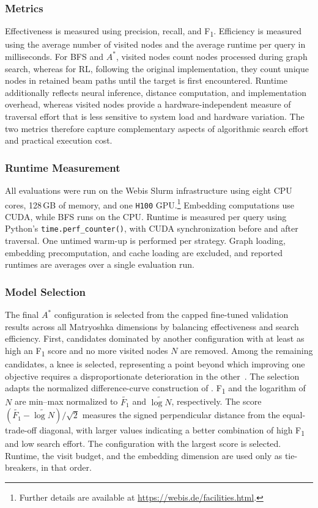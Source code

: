 

\subsubsection{Metrics}

Effectiveness is measured using precision, recall, and F\textsubscript{1}. Efficiency is measured using the average number of visited nodes and the average runtime per query in milliseconds. For BFS and \(A^*\), visited nodes count nodes processed during graph search, whereas for RL, following the original implementation, they count unique nodes in retained beam paths until the target is first encountered. Runtime additionally reflects neural inference, distance computation, and implementation overhead, whereas visited nodes provide a hardware-independent measure of traversal effort that is less sensitive to system load and hardware variation. The two metrics therefore capture complementary aspects of algorithmic search effort and practical execution cost.

\subsubsection{Runtime Measurement}

All evaluations were run on the Webis Slurm infrastructure using eight CPU cores, 128\,GB of memory, and one \texttt{H100} GPU.\footnote{Further details are available at \url{https://webis.de/facilities.html}.} Embedding computations use CUDA, while BFS runs on the CPU. Runtime is measured per query using Python's \texttt{time.perf\_counter()}, with CUDA synchronization before and after traversal. One untimed warm-up is performed per strategy. Graph loading, embedding precomputation, and cache loading are excluded, and reported runtimes are averages over a single evaluation run.

\subsubsection{Model Selection}

The final \(A^*\) configuration is selected from the capped fine-tuned validation results across all Matryoshka dimensions by balancing effectiveness and search efficiency. First, candidates dominated by another configuration with at least as high an F\textsubscript{1} score and no more visited nodes \(N\) are removed. Among the remaining candidates, a knee is selected, representing a point beyond which improving one objective requires a disproportionate deterioration in the other~\citep{branke:2004}. The selection adapts the normalized difference-curve construction of \citet{satopaa:2011}. F\textsubscript{1} and the logarithm of \(N\) are min--max normalized to $\widetilde{F_1}$ and $\widetilde{\log N}$, respectively. The score $(\widetilde{F_1}-\widetilde{\log N})/\sqrt{2}$ measures the signed perpendicular distance from the equal-trade-off diagonal, with larger values indicating a better combination of high F\textsubscript{1} and low search effort. The configuration with the largest score is selected. Runtime, the visit budget, and the embedding dimension are used only as tie-breakers, in that order.

